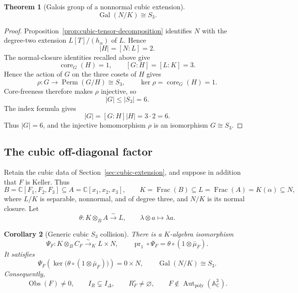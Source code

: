 \documentclass[11pt]{article}
\newtheorem{theorem}{Theorem}[section]
\newtheorem{corollary}[theorem]{Corollary}
\theoremstyle{remark}
\theoremstyle{definition}
\DeclareMathOperator{\Frac}{Frac}
\DeclareMathOperator{\Gal}{Gal}
\DeclareMathOperator{\Aut}{Aut}
\DeclareMathOperator{\core}{core}
\newcommand{\A}{\mathbb A}
\newcommand{\C}{\mathbb C}
\newcommand{\Obs}{\operatorname{Obs}}
\begin{document}
\begin{theorem}[Galois group of a nonnormal cubic extension]
\label{thm:index-three-core-free-s3}
\[
  \Gal(N/K)\cong S_3.
\]
\end{theorem}

\begin{proof}
Proposition~\ref{prop:cubic-tensor-decomposition} identifies \(N\) with
the degree-two extension \(L[T]/(h_\alpha)\) of \(L\).  Hence
\[
  |H|=[N:L]=2.
\]
The normal-closure identities recalled above give
\[
  \core_G(H)=1,
  \qquad
  [G:H]=[L:K]=3.
\]
Hence the action of \(G\) on the three cosets of \(H\) gives
\[
  \rho\colon G\longrightarrow\operatorname{Perm}(G/H)\cong S_3,
  \qquad
  \ker\rho=\core_G(H)=1.
\]
Core-freeness therefore makes \(\rho\) injective, so
\[
  |G|\leq |S_3|=6.
\]
The index formula gives
\[
  |G|=[G:H]|H|=3\cdot2=6.
\]
Thus \(|G|=6\), and the injective homomorphism \(\rho\) is an
isomorphism \(G\cong S_3\).
\end{proof}

\subsection{The cubic off-diagonal factor}

Retain the cubic data of Section~\ref{sec:cubic-extension}, and suppose
in addition that \(F\) is Keller.  Thus
\[
  B=\C[F_1,F_2,F_3]\subseteq A=\C[x_1,x_2,x_3],
  \qquad
  K=\Frac(B)\subseteq L=\Frac(A)=K(\alpha)\subseteq N,
\]
where \(L/K\) is separable, nonnormal, and of degree three, and \(N/K\)
is its normal closure.  Let
\[
  \theta\colon K\otimes_BA\xrightarrow{\sim}L,
  \qquad
  \lambda\otimes a\longmapsto\lambda a.
\]

\begin{corollary}[Generic cubic \(S_3\) collision]
\label{cor:cubic-s3-collision}
There is a \(K\)-algebra isomorphism
\[
  \Psi_F\colon
  K\otimes_BC_F\xrightarrow{\sim}_K L\times N,
  \qquad
  \operatorname{pr}_1\circ\Psi_F
  =
  \theta\circ(1\otimes\bar\mu_F).
\]
It satisfies
\[
  \Psi_F\!\left(
    \ker\bigl(\theta\circ(1\otimes\bar\mu_F)\bigr)
  \right)
  =
  0\times N,
  \qquad
  \Gal(N/K)\cong S_3.
\]
Consequently,
\[
  \Obs(F)\neq0,
  \qquad
  I_R\subsetneq I_\Delta,
  \qquad
  R_F^\circ\neq\varnothing,
  \qquad
  F\notin\Aut_{\mathrm{poly}}(\A^3_{\C}).
\]
\end{corollary}
\end{document}
